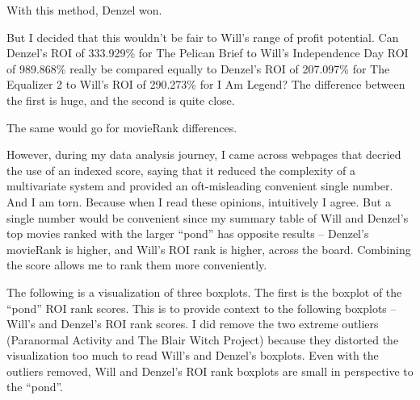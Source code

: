 \documentclass[]{article}
\begin{document}
With this method, Denzel won.

But I decided that this wouldn't be fair to Will's range of profit
potential. Can Denzel's ROI of 333.929\% for The Pelican Brief to Will's
Independence Day ROI of 989.868\% really be compared equally to Denzel's
ROI of 207.097\% for The Equalizer 2 to Will's ROI of 290.273\% for I Am
Legend? The difference between the first is huge, and the second is
quite close.

The same would go for movieRank differences.

However, during my data analysis journey, I came across webpages that
decried the use of an indexed score, saying that it reduced the
complexity of a multivariate system and provided an oft-misleading
convenient single number. \citep{StackExchange} And I am torn. Because
when I read these opinions, intuitively I agree. But a single number
would be convenient since my summary table of Will and Denzel's top
movies ranked with the larger \enquote{pond} has opposite results --
Denzel's movieRank is higher, and Will's ROI rank is higher, across the
board. Combining the score allows me to rank them more conveniently.

The following is a visualization of three boxplots. The first is the
boxplot of the \enquote{pond} ROI rank scores. This is to provide
context to the following boxplots -- Will's and Denzel's ROI rank
scores. I did remove the two extreme outliers (Paranormal Activity and
The Blair Witch Project) because they distorted the visualization too
much to read Will's and Denzel's boxplots. Even with the outliers
removed, Will and Denzel's ROI rank boxplots are small in perspective to
the \enquote{pond}.

\begin{center}
    \end{center}
\end{document}
